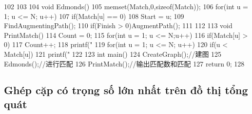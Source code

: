 \documentclass[11pt]{article}
\begin{document}
\begin{Code}
{{102       }
103   }
104   void Edmonds(){
105       memset(Match,0,sizeof(Match));
106       for(int u = 1; u <= N; u++)
107           if(Match[u] == 0){
108               Start = u;
109               FindAugmentingPath();
110               if(Finish > 0)AugmentPath();
111           }
112   }
113   void PrintMatch(){
114       Count = 0;
115       for(int u = 1; u <= N;u++)
116           if(Match[u] > 0)
117               Count++;
118       printf("%
119       for(int u = 1; u <= N; u++)
120           if(u < Match[u])
121               printf("%
122   }
123   int main(){
124       CreateGraph();//建图
125       Edmonds();//进行匹配
126       PrintMatch();//输出匹配数和匹配
127       return 0;
128   }
\end{Code}

\subsection{Ghép cặp có trọng số lớn nhất trên đồ thị tổng quát}
\end{document}
